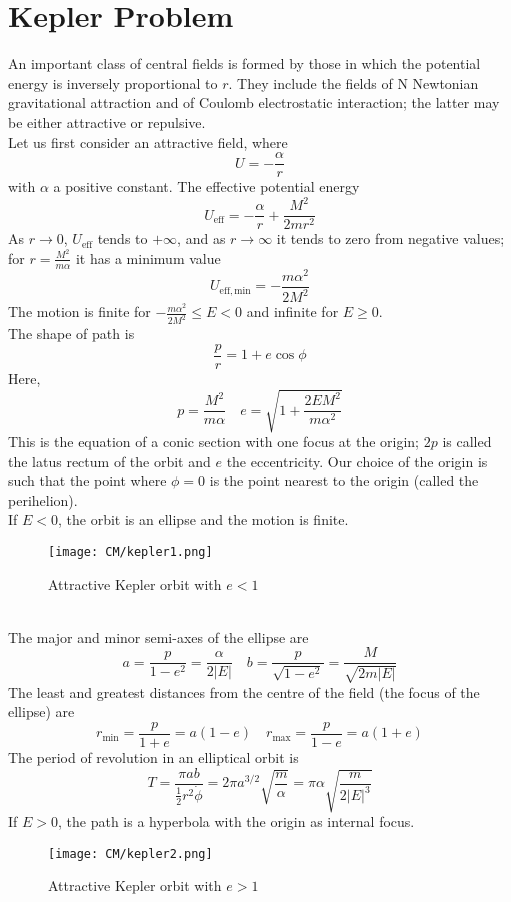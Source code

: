 \section{Kepler Problem}
An important class of central fields is formed by those in which the potential energy is inversely proportional to $r$. They include the fields of N Newtonian gravitational attraction and of Coulomb electrostatic interaction; the latter may be either attractive or repulsive.\\
Let us first consider an attractive field, where
\[U = -\frac{\alpha}{r}\]
with $\alpha$ a positive constant. The effective potential energy
\[U_{\mathrm{eff}} = -\frac{\alpha}{r} + \frac{M^2}{2mr^2}\]
As $r \to 0$, $U_{\mathrm{eff}}$ tends to $+\infty$, and as $r \to \infty$ it tends to zero from negative values; for $r = \frac{M^2}{m\alpha}$ it has a minimum value
\[U_{\mathrm{eff},\mathrm{min}} = -\frac{m\alpha^2}{2M^2}\]
The motion is finite for $-\frac{m\alpha^2}{2M^2} \leq E < 0$ and infinite for $E \ge 0$.\\
The shape of path is
\[\frac{p}{r} = 1 + e \cos \phi\]
Here,
\[p = \frac{M^2}{m\alpha} \quad e = \sqrt{1 + \frac{2EM^2}{m \alpha^2}}\]
This is the equation of a conic section with one focus at the origin; $2p$ is called the latus rectum of the orbit and $e$ the eccentricity. Our choice of the origin is such that the point where $\phi = 0$ is the point nearest to the origin (called the perihelion). \\
If $E < 0$,  the orbit is an ellipse and the motion is finite.
\begin{figure}[!h]
	\centering
	\texttt{[image: CM/kepler1.png]}
	\caption{Attractive Kepler orbit with $e < 1$}
\end{figure}\\
The major and minor semi-axes of the ellipse are
\[a = \frac{p}{1-e^2} = \frac{\alpha}{2|E|} \quad b = \frac{p}{\sqrt{1-e^2}} = \frac{M}{\sqrt{2m|E|}}\]
The least and greatest distances from the centre of the field (the focus of the ellipse) are
\[r_{\mathrm{min}} = \frac{p}{1+e} = a(1-e) \quad r_{\mathrm{max}} = \frac{p}{1-e} = a(1+e)\]
The period of revolution in an elliptical orbit is
\[T = \frac{\pi a b}{\frac{1}{2}r^2 \dot{\phi}} = 2\pi a^{3/2}\sqrt{\frac{m}{\alpha}} = \pi \alpha \sqrt{\frac{m}{2|E|^3}}\]
If $E > 0$, the path is a hyperbola with the origin as internal focus. 
\begin{figure}[!h]
	\centering
	\texttt{[image: CM/kepler2.png]}
	\caption{Attractive Kepler orbit with $e > 1$}
\end{figure}\\
